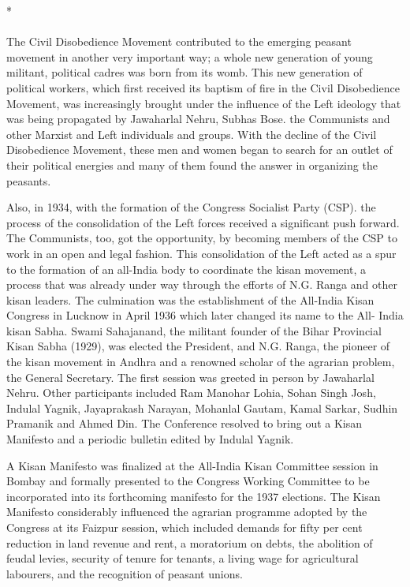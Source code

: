 \begin{center}*\end{center}

\paragraph*{}

The Civil Disobedience Movement contributed to the emerging peasant movement in another very important way; a whole new generation of young militant, political cadres was born from its womb. This new generation of political workers, which first received its baptism of fire in the Civil Disobedience Movement, was increasingly brought under the influence of the Left ideology that was being propagated by Jawaharlal Nehru, Subhas Bose. the Communists and other Marxist and Left individuals and groups. With the decline of the Civil Disobedience Movement, these men and women began to search for an outlet of their political energies and many of them found the answer in organizing the peasants.

Also, in 1934, with the formation of the Congress Socialist Party (CSP). the process of the consolidation of the Left forces received a significant push forward. The Communists, too, got the opportunity, by becoming members of the CSP to work in an open and legal fashion. This consolidation of the Left acted as a spur to the formation of an all-India body to coordinate the kisan movement, a process that was already under way through the efforts of N.G. Ranga and other kisan leaders. The culmination was the establishment of the All-India Kisan Congress in Lucknow in April 1936 which later changed its name to the All- India kisan Sabha. Swami Sahajanand, the militant founder of the Bihar Provincial Kisan Sabha (1929), was elected the President, and N.G. Ranga, the pioneer of the kisan movement in Andhra and a renowned scholar of the agrarian problem, the General Secretary. The first session was greeted in person by Jawaharlal Nehru. Other participants included Ram Manohar Lohia, Sohan Singh Josh, Indulal Yagnik, Jayaprakash Narayan, Mohanlal Gautam, Kamal Sarkar, Sudhin Pramanik and Ahmed Din. The Conference resolved to bring out a Kisan Manifesto and a periodic bulletin edited by Indulal Yagnik.

A Kisan Manifesto was finalized at the All-India Kisan Committee session in Bombay and formally presented to the Congress Working Committee to be incorporated into its forthcoming manifesto for the 1937 elections. The Kisan Manifesto considerably influenced the agrarian programme adopted by the Congress at its Faizpur session, which included demands for fifty per cent reduction in land revenue and rent, a moratorium on debts, the abolition of feudal levies, security of tenure for tenants, a living wage for agricultural labourers, and the recognition of peasant unions.

